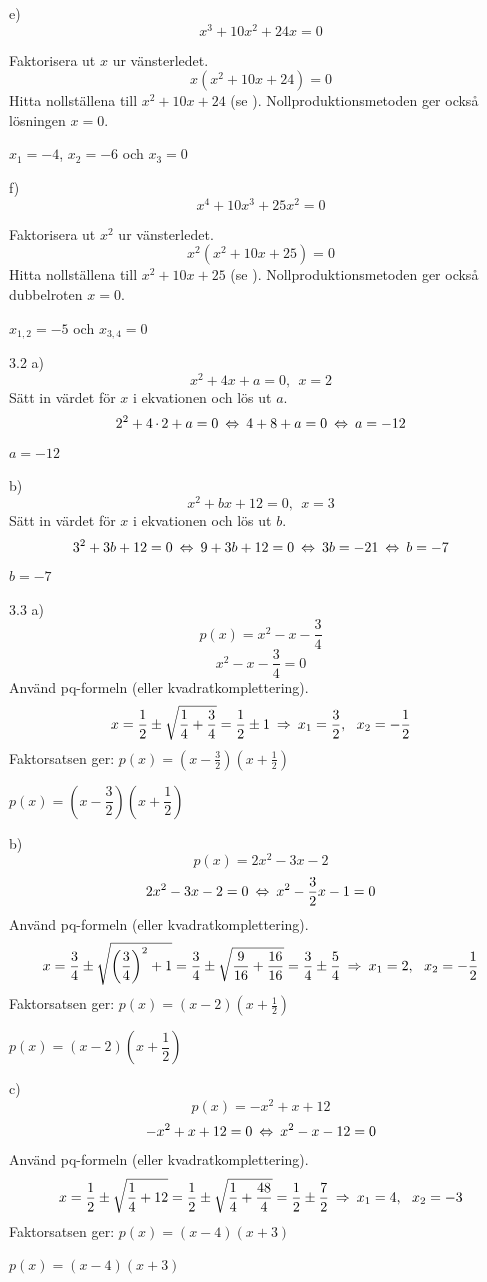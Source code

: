 \begin{task}{e)}
	\[x^3+10x^2+24x=0\]
	
	Faktorisera ut $x$ ur vänsterledet.
	\[x(x^2+10x+24)=0\]
	Hitta nollställena till $x^2+10x+24$ (se ). Nollproduktionsmetoden ger också lösningen $x=0$.
	
	\ans $x_1=-4$, $x_2=-6$ och $x_3=0$
\end{task}

\begin{task}{f)}
	\[x^4+10x^3+25x^2=0\]
	
	Faktorisera ut $x^2$ ur vänsterledet.
	\[x^2(x^2+10x+25)=0\]
	Hitta nollställena till $x^2+10x+25$ (se ). Nollproduktionsmetoden ger också dubbelroten $x=0$.
	
	\ans $x_{1,2}=-5$ och $x_{3,4}=0$
\end{task}

\begin{task}{3.2 a)}
	\[x^2+4x+a=0,~~x=2\]
	Sätt in värdet för $x$ i ekvationen och lös ut $a$.
	\[2^2+4\*2+a=0\lra 4+8+a=0\lra a=-12\]
	\ans $a=-12$
\end{task}

\begin{task}{b)}
	\[x^2+bx+12=0,~~x=3\]
	Sätt in värdet för $x$ i ekvationen och lös ut $b$.
	\[3^2+3b+12=0\lra 9+3b+12=0\lra 3b=-21 \lra b=-7\]
	\ans $b=-7$
\end{task}

\begin{task}{3.3 a)}
	\[p(x)=x^2-x-\frac{3}{4}\]
	\[x^2-x-\frac{3}{4}=0\]
	Använd pq-formeln (eller kvadratkomplettering).
	\[x=\frac{1}{2}\pm\sqrt{\frac{1}{4}+\frac{3}{4}}=\frac{1}{2}\pm 1 \ra x_1=\frac{3}{2},~~x_2=-\frac{1}{2}\]
	Faktorsatsen ger: $p(x)=(x-\frac{3}{2})(x+\frac{1}{2})$
	
	\ans $p(x)=\left(x-\dfrac{3}{2}\right)\left(x+\dfrac{1}{2}\right)$
\end{task}

\begin{task}{b)}
	\[p(x)=2x^2-3x-2\]
	\[2x^2-3x-2=0 \lra x^2-\frac{3}{2}x-1=0\]
	Använd pq-formeln (eller kvadratkomplettering).
	\[x=\frac{3}{4}\pm\sqrt{\left(\frac{3}{4}\right)^2+1}=
	\frac{3}{4}\pm\sqrt{\frac{9}{16}+\frac{16}{16}}=
	\frac{3}{4}\pm \frac{5}{4}
	\ra x_1=2,~~x_2=-\frac{1}{2}\]
	Faktorsatsen ger: $p(x)=(x-2)(x+\frac{1}{2})$
	
	\ans $p(x)=\left(x-2\right)\left(x+\dfrac{1}{2}\right)$
\end{task}

\begin{task}{c)}
	\[p(x)=-x^2+x+12\]
	\[-x^2+x+12=0 \lra x^2-x-12=0\]
	Använd pq-formeln (eller kvadratkomplettering).
	\[x=\frac{1}{2}\pm\sqrt{\frac{1}{4}+12}=
	\frac{1}{2}\pm\sqrt{\frac{1}{4}+\frac{48}{4}}=
	\frac{1}{2}\pm \frac{7}{2}
	\ra x_1=4,~~x_2=-3\]
	Faktorsatsen ger: $p(x)=(x-4)(x+3)$
	
	\ans $p(x)=(x-4)(x+3)$
\end{task}

